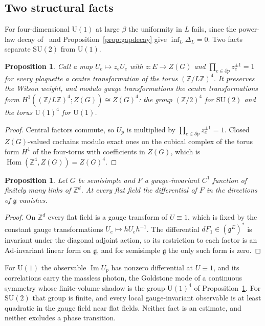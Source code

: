 \documentclass[aps,prd,twocolumn,superscriptaddress,nofootinbib,longbibliography,floatfix,amsmath,amssymb,10pt]{revtex4-2}
\newtheorem{proposition}[theorem]{Proposition}
\theoremstyle{definition}
\theoremstyle{remark}
\newcommand{\Z}{\mathbb{Z}}
\newcommand{\SU}{\mathrm{SU}}
\newcommand{\U}{\mathrm{U}}
\newcommand{\g}{\mathfrak{g}}
\begin{document}
\subsection{Two structural facts}

For four-dimensional $\U(1)$ at large $\beta$ the uniformity in $L$ fails,
since the power-law decay of~\cite{FS82} and Proposition~\ref{prop:gapdecay}
give $\inf_L\Delta_L=0$. Two facts separate $\SU(2)$ from $\U(1)$.

\begin{proposition}\label{prop:centre}
Call a map $U_e\mapsto z_eU_e$ with $z\colon E\to Z(G)$ and
$\prod_{e\in\partial p}z_e^{\pm1}=1$ for every plaquette a centre
transformation of the torus $(\Z/L\Z)^4$. It preserves the Wilson weight, and
modulo gauge transformations the centre transformations form
$H^1((\Z/L\Z)^4;Z(G))\cong Z(G)^4$: the group $(\Z/2)^4$ for $\SU(2)$ and the
torus $\U(1)^4$ for $\U(1)$.
\end{proposition}

\begin{proof}
Central factors commute, so $U_p$ is multiplied by $\prod_{e\in\partial
p}z_e^{\pm1}=1$. Closed $Z(G)$-valued cochains modulo exact ones on the cubical
complex of the torus form $H^1$ of the four-torus with coefficients in $Z(G)$,
which is $\operatorname{Hom}(\Z^4,Z(G))=Z(G)^4$.
\end{proof}

\begin{proposition}\label{prop:nolinear}
Let $G$ be semisimple and $F$ a gauge-invariant $C^1$ function of finitely
many links of $\Z^d$. At every flat field the differential of $F$ in the
directions of $\g$ vanishes.
\end{proposition}

\begin{proof}
On $\Z^d$ every flat field is a gauge transform of $U\equiv1$, which is fixed
by the constant gauge transformations $U_e\mapsto hU_eh^{-1}$. The
differential $dF_1\in(\g^E)^*$ is invariant under the diagonal adjoint action,
so its restriction to each factor is an $\mathrm{Ad}$-invariant linear form on
$\g$, and for semisimple $\g$ the only such form is zero.
\end{proof}

For $\U(1)$ the observable $\operatorname{Im}U_p$ has nonzero differential at
$U\equiv1$, and its correlations carry the massless photon, the Goldstone mode
of a continuous symmetry whose finite-volume shadow is the group $\U(1)^4$ of
Proposition~\ref{prop:centre}. For $\SU(2)$ that group is finite, and every
local gauge-invariant observable is at least quadratic in the gauge field near
flat fields. Neither fact is an estimate, and neither excludes a phase
transition.
\end{document}
